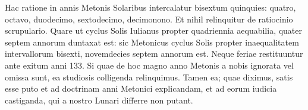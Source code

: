Hac ratione in annis  Metonis Solaribus intercalatur bisextum
quinquies: quatro, octavo, duodecimo, sextodecimo, decimonono.
Et nihil relinquitur de ratiocinio scrupulario.
Quare ut cyclus
Solis Iulianus propter quadriennia aequabilia, quater septem annorum
duntaxat est: sic Metonicus cyclus Solis propter inaequalitatem
intervallorum bisexti, novemdecies septem annorum est.
Neque feriae
restituuntur ante exitum anni 133.
Si quae de hoc magno anno Metonis
a nobis ignorata vel omissa sunt, ea studiosis colligenda relinquimus.
Tamen ea; quae diximus, satis esse puto et ad doctrinam anni
Metonici explicandam, et ad eorum iudicia castiganda, qui a nostro
Lunari differre non putant.
%

